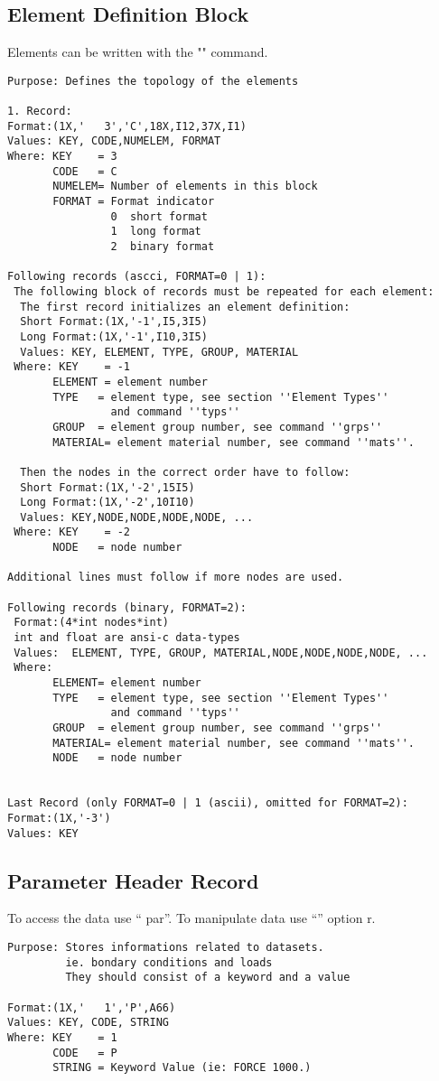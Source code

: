 \documentclass{article}
\begin{document}
\subsection{\label{Element Definition Block}Element Definition Block}
Elements can be written with the "" command.
\begin{verbatim}
Purpose: Defines the topology of the elements

1. Record:
Format:(1X,'   3','C',18X,I12,37X,I1)
Values: KEY, CODE,NUMELEM, FORMAT
Where: KEY    = 3
       CODE   = C
       NUMELEM= Number of elements in this block
       FORMAT = Format indicator
                0  short format
                1  long format 
                2  binary format 

Following records (ascci, FORMAT=0 | 1):
 The following block of records must be repeated for each element:
  The first record initializes an element definition:
  Short Format:(1X,'-1',I5,3I5)
  Long Format:(1X,'-1',I10,3I5)
  Values: KEY, ELEMENT, TYPE, GROUP, MATERIAL
 Where: KEY    = -1
       ELEMENT = element number
       TYPE   = element type, see section ''Element Types''
                and command ''typs''
       GROUP  = element group number, see command ''grps''
       MATERIAL= element material number, see command ''mats''.

  Then the nodes in the correct order have to follow:
  Short Format:(1X,'-2',15I5)
  Long Format:(1X,'-2',10I10)
  Values: KEY,NODE,NODE,NODE,NODE, ...
 Where: KEY    = -2
       NODE   = node number

Additional lines must follow if more nodes are used.

Following records (binary, FORMAT=2):
 Format:(4*int nodes*int)
 int and float are ansi-c data-types
 Values:  ELEMENT, TYPE, GROUP, MATERIAL,NODE,NODE,NODE,NODE, ...
 Where:
       ELEMENT= element number
       TYPE   = element type, see section ''Element Types''
                and command ''typs''
       GROUP  = element group number, see command ''grps''
       MATERIAL= element material number, see command ''mats''.
       NODE   = node number
  
  
Last Record (only FORMAT=0 | 1 (ascii), omitted for FORMAT=2):
Format:(1X,'-3')
Values: KEY
\end{verbatim}

\subsection{\label{Parameter Header Record}Parameter Header Record}
To access the data use `` par''.
To manipulate data use ``'' option r.
\begin{verbatim}
Purpose: Stores informations related to datasets.
         ie. bondary conditions and loads
         They should consist of a keyword and a value

Format:(1X,'   1','P',A66)  
Values: KEY, CODE, STRING
Where: KEY    = 1
       CODE   = P
       STRING = Keyword Value (ie: FORCE 1000.)

\end{verbatim}
\end{document}
